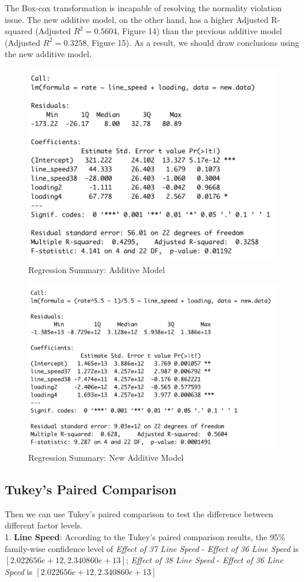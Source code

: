 \documentclass[11pt,a4paper]{article}
\begin{document}
The Box-cox transformation is incapable of resolving the normality violation issue. The new additive model, on the other hand, has a higher Adjusted R-squared (Adjusted $R^2=0.5604$, Figure 14) than the previous additive model (Adjusted $R^2=0.3258$, Figure 15). As a result, we should draw conclusions using the new additive model.
\begin{figure}[htb]
    \centering
    \includegraphics[scale=0.8]{R1}
    \caption{Regression Summary: Additive Model}
    \label{}
\end{figure}
\begin{figure}[htb]
    \centering
    \includegraphics[scale=0.8]{R2}
    \caption{Regression Summary: New Additive Model}
    \label{}
\end{figure}

\subsection{Tukey’s Paired Comparison}
Then we can use Tukey’s paired comparison to test the difference between different factor levels.\\
1. \textbf{Line Speed}: According to the Tukey’s paired comparison results, the 95\% family-wise confidence level of \textit{Effect of 37 Line Speed} - \textit{Effect of 36 Line Speed} is $[2.022656e+12,2.340860e+13]$; \textit{Effect of 38 Line Speed} - \textit{Effect of 36 Line Speed} is $[2.022656e+12,2.340860e+13]$
\end{document}
